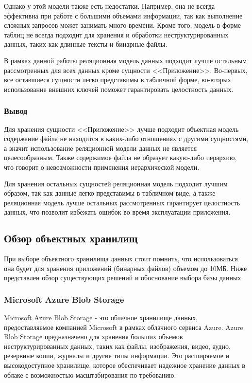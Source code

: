 Однако у этой модели также есть недостатки. Например, она не всегда эффективна при работе с большими объемами информации, так как выполнение сложных запросов может занимать много времени. Кроме того, модель в форме таблиц не всегда подходит для хранения и обработки неструктурированных данных, таких как длинные тексты и бинарные файлы.

В рамках данной работы реляционная модель данных подходит лучше остальным рассмотренных для всех данных кроме сущности <<Приложение>>. Во-первых, все оставшиеся сущности легко представимы в табличной форме, во-вторых использование внешних ключей поможет гарантировать целостность данных.

\subsubsection{Вывод}

Для хранения сущности <<Приложение>> лучше подходит объектная модель содержание файла не находится в каких-либо отношениях с другими сущностями, а значит использование реляционной модели данных не является целесообразным. Также содержимое файла не образует какую-либо иерархию, что говорит о невозможности применения иерархической модели.

Для хранения остальных сущностей реляционная модель подходит лучшим образом, так как данные легко представимы в табличном виде, а также реляционная модель лучше остальных рассмотренных гарантирует целостность данных, что позволит избежать ошибок во время эксплуатации приложения.

\subsection{Обзор объектных хранилищ}

При выборе объектного хранилища данных стоит помнить, что использоваться она будет для хранения приложений (бинарных файлов) объемом до 10МБ. Ниже представлен обзор существующих решений и обоснование выбора базы данных.

\subsubsection{Microsoft Azure Blob Storage}

Microsoft Azure Blob Storage - это облачное хранилище данных, предоставляемое компанией Microsoft в рамках облачного сервиса Azure. Azure Blob Storage предназначено для хранения больших объемов неструктурированных данных, таких как файлы, изображения, видео, аудио, резервные копии, журналы и другие типы информации. Это расширяемое и высокодоступное хранилище, которое обеспечивает надежное хранение данных в облаке с возможностью масштабирования по требованию.

